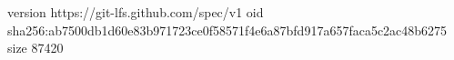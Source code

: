 version https://git-lfs.github.com/spec/v1
oid sha256:ab7500db1d60e83b971723ce0f58571f4e6a87bfd917a657faca5c2ac48b6275
size 87420
